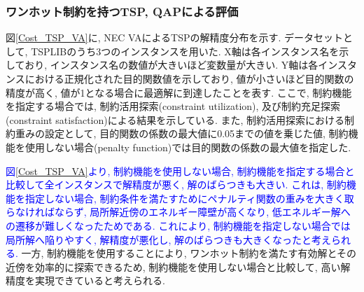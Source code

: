 \documentclass[submit,techrep,noauthor]{ipsj}
\begin{document}



\subsubsection{ワンホット制約を持つTSP, QAPによる評価}
図\ref{Cost_TSP_VA}に, NEC VAによるTSPの解精度分布を示す. データセットとして, TSPLIB\cite{tsplib}のうち3つのインスタンスを用いた. X軸は各インスタンス名を示しており, インスタンス名の数値が大きいほど変数量が大きい. Y軸は各インスタンスにおける正規化された目的関数値を示しており, 値が小さいほど目的関数の精度が高く, 値が1となる場合に最適解に到達したことを表す. ここで, 制約機能を指定する場合では, 制約活用探索(constraint utilization), 及び制約充足探索(constraint satisfaction)による結果を示している. また, 制約活用探索における制約重みの設定として, 目的関数の係数の最大値に0.05までの値を乗じた値, 制約機能を使用しない場合(penalty function)では目的関数の係数の最大値を指定した.

\textcolor{blue}{図\ref{Cost_TSP_VA}より, 制約機能を使用しない場合, 制約機能を指定する場合と比較して全インスタンスで解精度が悪く, 解のばらつきも大きい. これは, 制約機能を指定しない場合, 制約条件を満たすためにペナルティ関数の重みを大きく取らなければならず, 局所解近傍のエネルギー障壁が高くなり, 低エネルギー解への遷移が難しくなったためである. これにより, 制約機能を指定しない場合では局所解へ陥りやすく, 解精度が悪化し, 解のばらつきも大きくなったと考えられる.}
一方, 制約機能を使用することにより, ワンホット制約を満たす有効解とその近傍を効率的に探索できるため, 制約機能を使用しない場合と比較して, 高い解精度を実現できていると考えられる.
\end{document}
